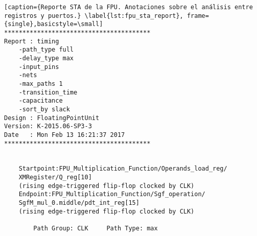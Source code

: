 \begin{lstlisting}[caption={Reporte STA de la FPU. Anotaciones sobre el análisis entre registros y puertos.} \label{lst:fpu_sta_report}, frame={single},basicstyle=\small]
****************************************
Report : timing
	-path_type full
	-delay_type max
	-input_pins
	-nets
	-max_paths 1
	-transition_time
	-capacitance
	-sort_by slack
Design : FloatingPointUnit
Version: K-2015.06-SP3-3
Date   : Mon Feb 13 16:21:37 2017
****************************************


	Startpoint:FPU_Multiplication_Function/Operands_load_reg/
	XMRegister/Q_reg[10]
	(rising edge-triggered flip-flop clocked by CLK)
	Endpoint:FPU_Multiplication_Function/Sgf_operation/
	SgfM_mul_0.middle/pdt_int_reg[15]
	(rising edge-triggered flip-flop clocked by CLK)
		
        Path Group: CLK 	Path Type: max


\end{lstlisting}
